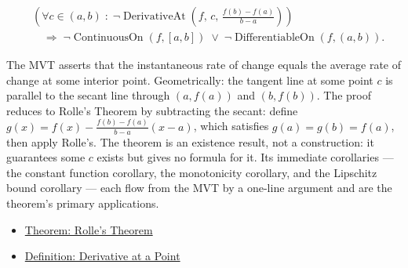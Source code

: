 \begin{remark*}
\begin{align*}
&\left(\forall c\in(a,b)\;:\;\neg\operatorname{DerivativeAt}\!\left(f,\,c,\,\tfrac{f(b)-f(a)}{b-a}\right)\right)\\
&\quad\Longrightarrow\;
\neg\operatorname{ContinuousOn}(f,[a,b])
\;\lor\;
\neg\operatorname{DifferentiableOn}(f,(a,b)).
\end{align*}
\end{remark*}

\begin{remark*}[Interpretation]
The MVT asserts that the instantaneous rate of change equals the average rate of change at some interior point. Geometrically: the tangent line at some point $c$ is parallel to the secant line through $(a,f(a))$ and $(b,f(b))$. The proof reduces to Rolle's Theorem by subtracting the secant: define $g(x) = f(x) - \tfrac{f(b)-f(a)}{b-a}(x-a)$, which satisfies $g(a)=g(b)=f(a)$, then apply Rolle's. The theorem is an existence result, not a construction: it guarantees some $c$ exists but gives no formula for it. Its immediate corollaries --- the constant function corollary, the monotonicity corollary, and the Lipschitz bound corollary --- each flow from the MVT by a one-line argument and are the theorem's primary applications.
\end{remark*}

\begin{remark*}[Dependencies]
\begin{itemize}
  \item \hyperref[thm:rolles-theorem]{Theorem: Rolle's Theorem}
  \item \hyperref[def:derivative-at-a-point]{Definition: Derivative at a Point}
\end{itemize}
\end{remark*}
